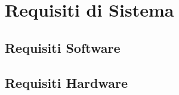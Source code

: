 \section{Requisiti di Sistema}\label{Requisiti}

\subsection{Requisiti Software}\label{RS}


\subsection{Requisiti Hardware}\label{RH}